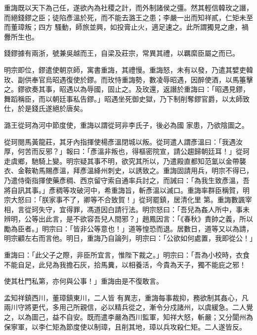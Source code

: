 \begin{pinyinscope}
 重誨既以天下為己任，遂欲內為社稷之計，而外制諸侯之彊。然其輕信韓玫之譖，而絕錢鏐之臣；徒陷彥溫於死，而不能去潞王之患；李嚴一出而知祥貳，仁矩未至而董璋叛；四方
 騷動，師旅並興，如投膏止火，適足速之。此所謂獨見之慮，禍釁所生也。



 錢鏐據有兩浙，號兼吳越而王，自梁及莊宗，常異其禮，以羈縻臣屬之而已。



 明宗即位，鏐遣使朝京師，寓書重誨，其禮慢。重誨怒，未有以發，乃遣其嬖吏韓玫、副供奉官烏昭遇復使於鏐。而玫恃重誨勢，數凌辱昭遇，因醉使酒，以馬箠擊之。鏐欲奏其事，昭遇以為辱國，固止之。及玫還，返譖於重誨曰：「昭遇見鏐，舞蹈稱臣，而以朝廷事私告鏐。」昭遇坐死御史獄，乃下制削奪鏐官爵，以太師致仕，於是錢氏遂絕於唐矣。



 潞王從珂為河中節度使，重誨以謂從珂非李氏子，後必為國
 家患，乃欲陰圖之。



 從珂閱馬黃龍莊，其牙內指揮使楊彥溫閉城以叛。從珂遣人謂彥溫曰：「我遇汝厚，何苦而反邪？」報曰：「彥溫非叛也，得樞密院宣，請公趨歸朝廷耳！」從珂走虞鄉，馳騎上變。明宗疑其事不明，欲究其所以，乃遣殿直都知范氳以金帶襲衣、金鞍勒馬賜彥溫，拜彥溫絳州刺史，以誘致之。重誨固請用兵，明宗不得已，乃遣侍衛指揮使藥彥稠、西京留守索自通率兵討之，而誡曰：「為我生致彥溫，吾將自訊其事。」彥稠等攻破河中，希重誨旨，斬彥溫以滅口。重誨率群臣稱賀，明宗大怒曰：「朕家事不了，卿等不合致賀！」從珂罷鎮，居清化里
 第。重誨數諷宰相，言從珂失守，宜得罪，馮道因白請行法。明宗怒曰：「吾兒為姦人所中，事未辨明，公等出此言，是不欲容吾兒人間邪？」趙鳳因言：「《春秋》責帥之義，所以勵為臣者。」明宗曰：「皆非公等意也！」道等惶恐而退。居數日，道等又以為請，明宗顧左右而言他。明日，重誨乃自論列，明宗曰：「公欲如何處置，我即從公！」



 重誨曰：「此父子之際，非臣所宜言，惟陛下裁之。」明宗曰：「吾為小校時，衣食不能自足，此兒為我擔石灰，拾馬糞，以相養活，今貴為天子，獨不能庇之邪！



 使其杜門私第，亦何與公事！」重誨由是不復敢言。



 孟知祥鎮西川，董璋鎮東川，二人皆
 有異志，重誨每事裁抑，務欲制其姦心，凡兩川守將更代，多用己所親信，必以精兵從之，漸令分戍諸州，以虞緩急。二人覺之，以為圖己，益不自安。既而遣李嚴為西川監軍，知祥大怒，斬嚴；又分閬州為保寧軍，以李仁矩為節度使以制璋，且削其地，璋以兵攻殺仁矩。二人遂皆反。




\end{pinyinscope}
